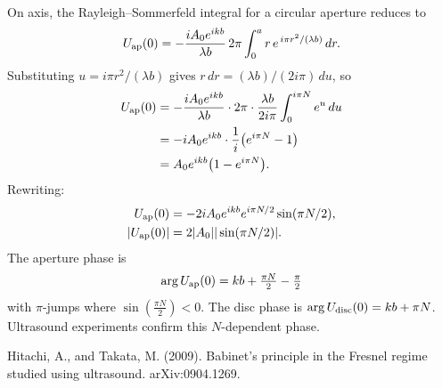 \begin{technical}
\\[0.4em]
On axis, the Rayleigh–Sommerfeld integral for a circular aperture reduces to
\[
U_{\rm ap}(0) = -\frac{iA_0 e^{ikb}}{\lambda b} \, 2\pi \int_0^a r\, e^{\,i\pi r^{2}/(\lambda b)}\, dr.
\]
Substituting $u = i\pi r^{2}/(\lambda b)$ gives $r\, dr = (\lambda b)/(2i\pi)\, du$, so
\begin{align*}
U_{\rm ap}(0) &= -\frac{iA_0 e^{ikb}}{\lambda b} \cdot 2\pi \cdot \frac{\lambda b}{2i\pi} \int_0^{i\pi N} e^{u}\, du \\
&= -i A_0 e^{ikb} \cdot \frac{1}{i} \bigl(e^{i\pi N} - 1\bigr) \\
&= A_0 e^{ikb} \bigl(1 - e^{i\pi N}\bigr).
\end{align*}
Rewriting:
\begin{align*}
U_{\rm ap}(0) &= -2i A_0 e^{ikb} e^{i\pi N/2} \sin(\pi N/2), \\
|U_{\rm ap}(0)| &= 2|A_0| |\sin(\pi N/2)|.
\end{align*}
The aperture phase is
\[
\arg U_{\rm ap}(0) = kb + \tfrac{\pi N}{2} - \tfrac{\pi}{2}
\]
with $\pi$-jumps where $\sin(\tfrac{\pi N}{2}) < 0$. The disc phase is $\arg U_{\rm disc}(0) = kb + \pi N$. Ultrasound experiments confirm this $N$-dependent phase.

\techref
{\footnotesize
Hitachi, A., and Takata, M. (2009). Babinet's principle in the Fresnel regime studied using ultrasound. arXiv:0904.1269.
}
\end{technical}
